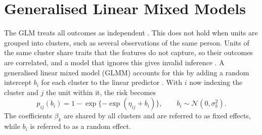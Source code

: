 
\section{Generalised Linear Mixed Models}
\label{sec:tech-glmm}
\label{sec:tech-model}
\label{sec:tech-random-intercept}

The GLM treats all outcomes as independent \cite[Section~3.4]{dobson2002glm}. This does
not hold when units are grouped into clusters, such as several observations of the same person. Units
of the same cluster share traits that the features do not capture, so their outcomes are correlated,
and a model that ignores this gives invalid inference \cite[Section~11.1]{dobson2002glm}. A generalised linear mixed model (GLMM) accounts for this by adding
a random intercept $b_i$ for each cluster to the linear predictor \cite[Section~11.5]{dobson2002glm}.
With $i$ now indexing the cluster and $j$ the unit within it, the risk becomes
\begin{equation}
  p_{ij}(b_i) = 1 - \exp\{-\exp(\eta_{ij} + b_i)\},
  \qquad
  b_i \sim \mathcal{N}(0, \sigma_b^2).
  \label{eq:tech-glmm}
\end{equation}
The coefficients $\beta_k$ are shared by all clusters and are referred to as fixed effects, while $b_i$
is referred to as a random effect.


